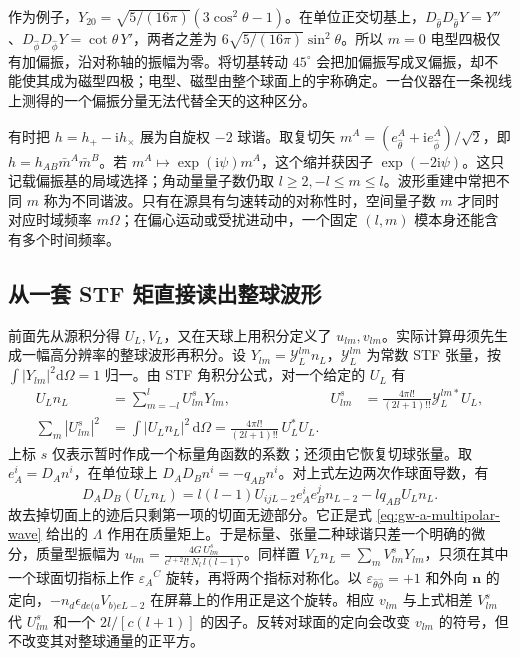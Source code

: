 作为例子，$Y_{20}=\sqrt{5/(16\pi)}(3\cos^2\theta-1)$。在单位正交切基上，$D_{\hat\theta}D_{\hat\theta}Y=Y''$、$D_{\hat\phi}D_{\hat\phi}Y=\cot\theta\,Y'$，两者之差为 $6\sqrt{5/(16\pi)}\sin^2\theta$。所以 $m=0$ 电型四极仅有加偏振，沿对称轴的振幅为零。将切基转动 $45^\circ$ 会把加偏振写成叉偏振，却不能使其成为磁型四极；电型、磁型由整个球面上的宇称确定。一台仪器在一条视线上测得的一个偏振分量无法代替全天的这种区分。

有时把 $h=h_+-\mathrm i h_\times$ 展为自旋权 $-2$ 球谐。取复切矢 $m^A=(e_{\hat\theta}^A+\mathrm ie_{\hat\phi}^A)/\sqrt2$，即 $h=h_{AB}\bar m^A\bar m^B$。若 $m^A\mapsto\exp(\mathrm i\psi)m^A$，这个缩并获因子 $\exp(-2\mathrm i\psi)$。这只记载偏振基的局域选择；角动量量子数仍取 $l\ge2,-l\le m\le l$。波形重建中常把不同 $m$ 称为不同谐波。只有在源具有匀速转动的对称性时，空间量子数 $m$ 才同时对应时域频率 $m\Omega$；在偏心运动或受扰进动中，一个固定 $(l,m)$ 模本身还能含有多个时间频率。

\subsection{从一套 STF 矩直接读出整球波形}

前面先从源积分得 $U_L,V_L$，又在天球上用积分定义了 $u_{lm},v_{lm}$。实际计算毋须先生成一幅高分辨率的整球波形再积分。设 $Y_{lm}=\mathcal Y_L^{lm}n_L$，$\mathcal Y_L^{lm}$ 为常数 STF 张量，按 $\int |Y_{lm}|^2\mathrm d\Omega=1$ 归一。由 STF 角积分公式，对一个给定的 $U_L$ 有
\begin{align*}
 U_L n_L&=\sum_{m=-l}^l U_{lm}^{s}Y_{lm},&
 U_{lm}^{s}
 &=\frac{4\pi l!}{(2l+1)!!}\mathcal Y_L^{lm*} U_L ,\\
 \sum_m|U_{lm}^{s}|^2&=\int |U_L n_L|^2\,\mathrm d\Omega
 =\frac{4\pi l!}{(2l+1)!!}\, U_L^*U_L .
\end{align*}
上标 $s$ 仅表示暂时作成一个标量角函数的系数；还须由它恢复切球张量。取 $e_A^i=D_A n^i$，在单位球上 $D_A D_B n^i=-q_{AB}n^i$。对上式左边两次作球面导数，有
\[
 D_A D_B(U_L n_L)=l(l-1)U_{ijL-2}e_A^i e_B^j n_{L-2}
                        -l q_{AB}U_L n_L .
\]
故去掉切面上的迹后只剩第一项的切面无迹部分。它正是式 \eqref{eq:gw-a-multipolar-wave} 给出的 $\Lambda$ 作用在质量矩上。于是标量、张量二种球谐只差一个明确的微分，质量型振幅为 $u_{lm}=\frac{4G\,U_{lm}^{s}}{c^{l+2}l!\,N_l\,l(l-1)}$。同样置 $V_L n_L=\sum_m V_{lm}^{s}Y_{lm}$，只须在其中一个球面切指标上作 $\varepsilon_A{}^C$ 旋转，再将两个指标对称化。以 $\varepsilon_{\hat\theta\hat\phi}=+1$ 和外向 $\bm n$ 的定向，$-n_d\epsilon_{de(a}V_{b)eL-2}$ 在屏幕上的作用正是这个旋转。相应 $v_{lm}$ 与上式相差 $V_{lm}^{s}$ 代 $U_{lm}^{s}$ 和一个 $2l/[c(l+1)]$ 的因子。反转对球面的定向会改变 $v_{lm}$ 的符号，但不改变其对整球通量的正平方。

